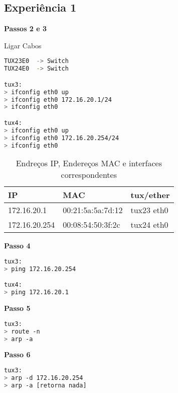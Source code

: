 \subsection{Experiência 1} \label{exp1_steps}
\textbf{Passos 2 e 3} 

Ligar Cabos

\begin{lstlisting}[language=bash]
TUX23E0  -> Switch
TUX24E0  -> Switch

tux3:
> ifconfig eth0 up
> ifconfig eth0 172.16.20.1/24
> ifconfig eth0 

tux4:
> ifconfig eth0 up
> ifconfig eth0 172.16.20.254/24
> ifconfig eth0 

\end{lstlisting}

\begin{table}[h]
\centering
\begin{tabular}{|l|l|l|}
\hline
IP            & MAC               & tux/ether  \\ \hline
172.16.20.1   & 00:21:5a:5a:7d:12 & tux23 eth0 \\ \hline
172.16.20.254 & 00:08:54:50:3f:2c & tux24 eth0 \\ \hline
\end{tabular}
\caption{\label{tab:table-name}Endreços IP, Endereços MAC e interfaces correspondentes}
\end{table}

\textbf{Passo 4}

\begin{lstlisting}[language=bash]
tux3:
> ping 172.16.20.254

tux4:
> ping 172.16.20.1
\end{lstlisting}

\textbf{Passo 5}

\begin{lstlisting}[language=bash]
tux3:
> route -n
> arp -a
\end{lstlisting}

\textbf{Passo 6}

\begin{lstlisting}[language=bash]
tux3:
> arp -d 172.16.20.254
> arp -a [retorna nada]
\end{lstlisting}
